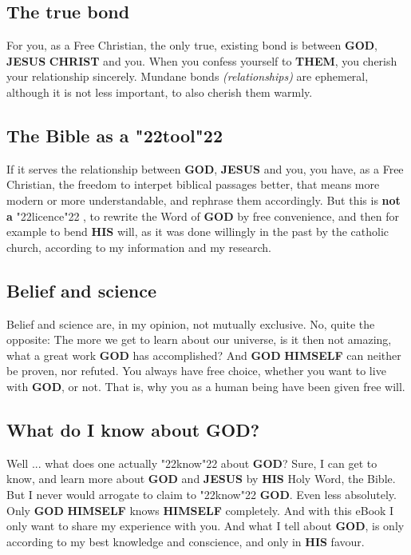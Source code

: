 \documentclass[10pt,a5paper]{article}
\newcommand{\Christ}[0]{\textbf{CHRIST}}
\newcommand{\God}[0]{\textbf{GOD}}
\newcommand{\Himself}[0]{\textbf{HIMSELF}}
\newcommand{\His}[0]{\textbf{HIS}}
\newcommand{\Jesus}[0]{\textbf{JESUS}}
\newcommand{\Them}[0]{\textbf{THEM}}
\newcommand{\q}[1]{\char"22{#1}\char"22 }
\begin{document}
	\subsection{The true bond}
		For you,
		as a Free Christian,
		the only true,
		existing bond is between {\God},
		{\Jesus} {\Christ} and you.
		When you confess yourself to {\Them},
		you cherish your relationship sincerely.
		Mundane bonds \textit{(relationships)} are ephemeral,
		although it is not less important,
		to also cherish them warmly.
			
	\subsection{The Bible as a \q{tool}}
		If it serves the relationship between {\God},
		{\Jesus} and you,
		you have,
		as a Free Christian,
		the freedom to interpet biblical passages better,
		that means more modern or more understandable,
		and rephrase them accordingly.
		But this is \textbf{not a} \q{licence},
		to rewrite the Word of {\God} by free convenience,
		and then for example to bend {\His} will,
		as it was done willingly in the past by the catholic church,
		according to my information and my research.
		
	\subsection{Belief and science}
		Belief and science are,
		in my opinion,
		not mutually exclusive.
		No,
		quite the opposite:
		The more we get to learn about our universe,
		is it then not amazing,
		what a great work {\God} has accomplished?
		And {\God} {\Himself} can neither be proven,
		nor refuted.
		You always have free choice,
		whether you want to live with {\God},
		or not.
		That is,
		why you as a human being have been given free will.

	\subsection{What do I know about {\God}?}
		Well ... what does one actually \q{know} about {\God}?
		Sure,
		I can get to know,
		and learn more about {\God} and {\Jesus} by {\His} Holy Word,
		the Bible.
		But I never would arrogate to claim to \q{know} {\God}.
		Even less absolutely.
		Only {\God} {\Himself} knows {\Himself} completely.
		And with this eBook I only want to share my experience with you.
		And what I tell about {\God},
		is only according to my best knowledge and conscience,
		and only in {\His} favour.
		
\end{document}

